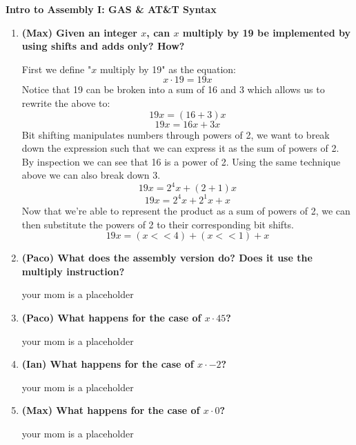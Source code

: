 \documentclass{article}
\begin{document}
\centering
{\huge \textbf{Intro to Assembly I: GAS \& AT\&T Syntax}}
\vspace{0.5cm}

\begin{enumerate}
    \item \textbf{(Max) Given an integer \( x \), can \( x \) multiply by 19 be implemented by using shifts and adds only? How?}
    
    First we define "\( x \) multiply by 19" as the equation:
    \[
    x \cdot 19 = 19x
    \]
    Notice that 19 can be broken into a sum of 16 and 3 which allows us to rewrite the above to:
    \[
    19x = (16+3)x 
    \]
    \[
    19x = 16x + 3x
    \]
    Bit shifting manipulates numbers through powers of 2, we want to break down the expression such that we
    can express it as the sum of powers of 2. By inspection we can see that 16 is a power of 2. Using the same
    technique above we can also break down 3.
    \[
    19x = 2^4x + (2+1)x
    \]
    \[
    19x = 2^4x + 2^1x + x
    \]
    Now that we're able to represent the product as a sum of powers of 2, we can then substitute the powers of 2 to
    their corresponding bit shifts.
    \[
    19x = (x << 4) + (x << 1) + x
    \]

    \item \textbf{(Paco) What does the assembly version do? Does it use the multiply instruction?}
    
    your mom is a placeholder

    \item \textbf{(Paco) What happens for the case of \( x \cdot 45 \)?}
    
    your mom is a placeholder

    \item \textbf{(Ian) What happens for the case of \( x \cdot -2 \)?}
    
    your mom is a placeholder

    \item \textbf{(Max) What happens for the case of \( x \cdot  0 \)?}
    
    your mom is a placeholder
\end{enumerate}
\end{document}
